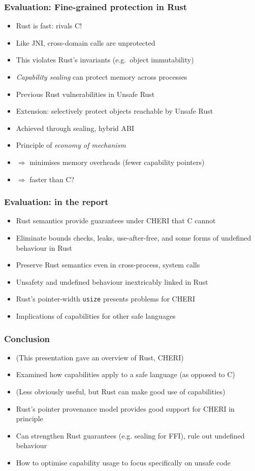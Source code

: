 \documentclass{beamer}
\begin{document}
\begin{frame}
\frametitle{Evaluation: Fine-grained protection in Rust}

\begin{itemize}
    \item Rust is fast: rivals C!
    \item Like JNI, cross-domain calls are unprotected
    \item This violates Rust's invariants (e.g.\ object immutability)
    \item \emph{Capability sealing} can protect memory across processes
    \item Previous Rust vulnerabilities in Unsafe Rust
    \item Extension: selectively protect objects reachable by Unsafe Rust
    \item Achieved through sealing, hybrid ABI
    \item Principle of \emph{economy of mechanism}
    \item \(\Rightarrow\) minimises memory overheads (fewer capability pointers)
    \item \(\Rightarrow\) faster than C?
\end{itemize}
\end{frame}


\begin{frame}
\frametitle{Evaluation: in the report}

\begin{itemize}
    \item Rust semantics provide guarantees under CHERI that C cannot
    \item Eliminate bounds checks, leaks, use-after-free, and some forms
    of undefined behaviour in Rust
    \item Preserve Rust semantics even in cross-process, system calls
    \item Unsafety and undefined behaviour inextricably linked in Rust
    \item Rust's pointer-width \texttt{usize} presents problems for CHERI
    \item Implications of capabilities for other safe languages
\end{itemize}
\end{frame}


\begin{frame}
\frametitle{Conclusion}

\begin{itemize}
    \item (This presentation gave an overview of Rust, CHERI)
    \item Examined how capabilities apply to a safe language (as opposed
    to C)
    \item (Less obviously useful, but Rust can make good use of capabilities)
    \item Rust's pointer provenance model provides good support for
    CHERI in principle
    \item Can strengthen Rust guarantees (e.g. sealing for FFI), rule out undefined behaviour
    \item How to optimise capability usage to focus specifically on unsafe code
\end{itemize}
\end{frame}
\end{document}
